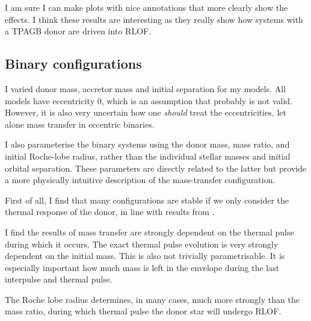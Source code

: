 \documentclass[a4paper,10pt]{article}
\begin{document}
I am sure I can make plots with nice annotations that more clearly show the effects.
I think
these results are interesting as they really show how systems with a TPAGB donor are driven
into RLOF.

\subsection{Binary configurations}

I varied donor mass, accretor mass and initial separation for my models.
All models have
eccentricity 0, which is an assumption that probably is not valid.
However, it is also
very uncertain how one \emph{should} treat the eccentricities, let alone mass transfer in
eccentric binaries.

I also parameterise the binary systems using the donor mass, mass ratio, and initial Roche-lobe radius, rather than the individual stellar masses and initial orbital separation.
These parameters are directly related to the latter but provide a more physically intuitive description of the mass-transfer configuration.

First of all, I find that many configurations are stable if we only consider the thermal response of the donor, in line with results from \citet{temmink2022}.

I find the results of mass transfer are strongly dependent on the thermal pulse  during which it occurs.
The exact thermal pulse evolution
is very strongly dependent on the initial mass.
This is also not trivially parametrisable.
It is especially important how much mass is left in the envelope
during the last interpulse and thermal pulse.

The Roche lobe radius determines, in many cases, much more strongly than the mass ratio, during which thermal pulse the donor star will undergo RLOF.

\begin{figure}[ht]
	\centering
\end{figure}
\end{document}
